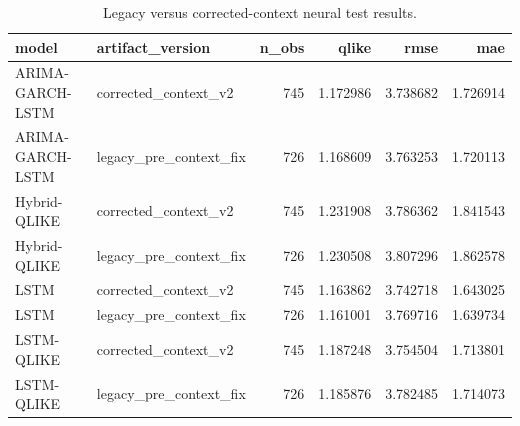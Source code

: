 \begin{table}[!t]
\centering
\caption{Legacy versus corrected-context neural test results.}
\label{tab:neural-retraining-comparison}
\scriptsize
\begin{tabular}{@{}llrrrr@{}}
\toprule
model & artifact\_version & n\_obs & qlike & rmse & mae \\
\midrule
ARIMA-GARCH-LSTM & corrected\_context\_v2 & 745 & 1.172986 & 3.738682 & 1.726914 \\
ARIMA-GARCH-LSTM & legacy\_pre\_context\_fix & 726 & 1.168609 & 3.763253 & 1.720113 \\
Hybrid-QLIKE & corrected\_context\_v2 & 745 & 1.231908 & 3.786362 & 1.841543 \\
Hybrid-QLIKE & legacy\_pre\_context\_fix & 726 & 1.230508 & 3.807296 & 1.862578 \\
LSTM & corrected\_context\_v2 & 745 & 1.163862 & 3.742718 & 1.643025 \\
LSTM & legacy\_pre\_context\_fix & 726 & 1.161001 & 3.769716 & 1.639734 \\
LSTM-QLIKE & corrected\_context\_v2 & 745 & 1.187248 & 3.754504 & 1.713801 \\
LSTM-QLIKE & legacy\_pre\_context\_fix & 726 & 1.185876 & 3.782485 & 1.714073 \\
\bottomrule
\end{tabular}
\end{table}
